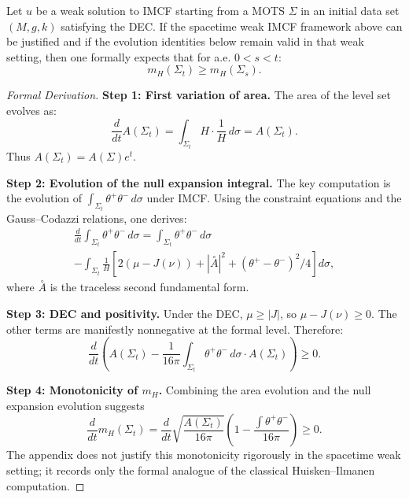 \begin{theorem}\label{thm:HawkingMonotone}
Let $u$ be a weak solution to IMCF starting from a MOTS $\Sigma$ in an initial data set $(M, g, k)$ satisfying the DEC. If the spacetime weak IMCF framework above can be justified and if the evolution identities below remain valid in that weak setting, then one formally expects that for a.e. $0 < s < t$:
\begin{equation}
    m_H(\Sigma_t) \ge m_H(\Sigma_s).
\end{equation}
\end{theorem}

\begin{proof}[Formal Derivation]
\textbf{Step 1: First variation of area.}
The area of the level set evolves as:
\begin{equation}
    \frac{d}{dt} A(\Sigma_t) = \int_{\Sigma_t} H \cdot \frac{1}{H} \, d\sigma = A(\Sigma_t).
\end{equation}
Thus $A(\Sigma_t) = A(\Sigma) e^t$.

\textbf{Step 2: Evolution of the null expansion integral.}
The key computation is the evolution of $\int_{\Sigma_t} \theta^+ \theta^- \, d\sigma$ under IMCF. Using the constraint equations and the Gauss--Codazzi relations, one derives:
\begin{multline}
    \frac{d}{dt} \int_{\Sigma_t} \theta^+ \theta^- \, d\sigma = \int_{\Sigma_t} \theta^+ \theta^- \, d\sigma \\
    - \int_{\Sigma_t} \frac{1}{H} \left[ 2(\mu - J(\nu)) + |\overset{\circ}{A}|^2 + (\theta^+ - \theta^-)^2 / 4 \right] d\sigma,
\end{multline}
where $\overset{\circ}{A}$ is the traceless second fundamental form.

\textbf{Step 3: DEC and positivity.}
Under the DEC, $\mu \ge |J|$, so $\mu - J(\nu) \ge 0$. The other terms are manifestly nonnegative at the formal level. Therefore:
\begin{equation}
    \frac{d}{dt} \left( A(\Sigma_t) - \frac{1}{16\pi} \int_{\Sigma_t} \theta^+ \theta^- \, d\sigma \cdot A(\Sigma_t) \right) \ge 0.
\end{equation}

\textbf{Step 4: Monotonicity of $m_H$.}
Combining the area evolution and the null expansion evolution suggests
\begin{equation}
    \frac{d}{dt} m_H(\Sigma_t) = \frac{d}{dt} \sqrt{\frac{A(\Sigma_t)}{16\pi}} \left( 1 - \frac{\int \theta^+ \theta^-}{16\pi} \right) \ge 0.
\end{equation}
The appendix does not justify this monotonicity rigorously in the spacetime weak setting; it records only the formal analogue of the classical Huisken--Ilmanen computation.
\end{proof}

